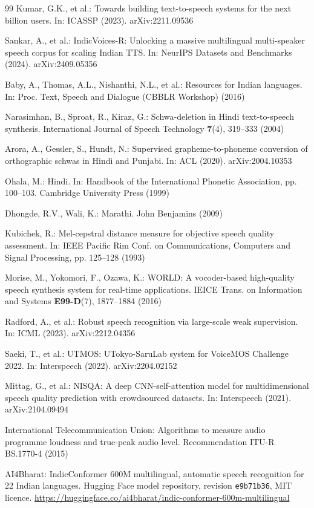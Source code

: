\documentclass[runningheads]{llncs}
\begin{document}
\begin{thebibliography}{99}
Kumar, G.K., et al.: Towards building text-to-speech systems for the next
billion users. In: ICASSP (2023). arXiv:2211.09536

Sankar, A., et al.: IndicVoices-R: Unlocking a massive multilingual
multi-speaker speech corpus for scaling Indian TTS. In: NeurIPS Datasets and
Benchmarks (2024). arXiv:2409.05356

Baby, A., Thomas, A.L., Nishanthi, N.L., et al.: Resources for Indian
languages. In: Proc. Text, Speech and Dialogue (CBBLR Workshop) (2016)

Narasimhan, B., Sproat, R., Kiraz, G.: Schwa-deletion in Hindi text-to-speech
synthesis. International Journal of Speech Technology \textbf{7}(4),
319--333 (2004)

Arora, A., Gessler, S., Hundt, N.: Supervised grapheme-to-phoneme conversion
of orthographic schwas in Hindi and Punjabi. In: ACL (2020). arXiv:2004.10353

Ohala, M.: Hindi. In: Handbook of the International Phonetic Association, pp.
100--103. Cambridge University Press (1999)

Dhongde, R.V., Wali, K.: Marathi. John Benjamins (2009)

Kubichek, R.: Mel-cepstral distance measure for objective speech quality
assessment. In: IEEE Pacific Rim Conf. on Communications, Computers and Signal
Processing, pp. 125--128 (1993)

Morise, M., Yokomori, F., Ozawa, K.: WORLD: A vocoder-based high-quality
speech synthesis system for real-time applications. IEICE Trans. on
Information and Systems \textbf{E99-D}(7), 1877--1884 (2016)

Radford, A., et al.: Robust speech recognition via large-scale weak
supervision. In: ICML (2023). arXiv:2212.04356

Saeki, T., et al.: UTMOS: UTokyo-SaruLab system for VoiceMOS Challenge 2022.
In: Interspeech (2022). arXiv:2204.02152

Mittag, G., et al.: NISQA: A deep CNN-self-attention model for
multidimensional speech quality prediction with crowdsourced datasets. In:
Interspeech (2021). arXiv:2104.09494

International Telecommunication Union: Algorithms to measure audio programme
loudness and true-peak audio level. Recommendation ITU-R BS.1770-4 (2015)

AI4Bharat: IndicConformer 600M multilingual, automatic speech recognition for
22 Indian languages. Hugging Face model repository, revision
\texttt{e9b71b36}, MIT licence.
\url{https://huggingface.co/ai4bharat/indic-conformer-600m-multilingual}

\end{thebibliography}
\end{document}
